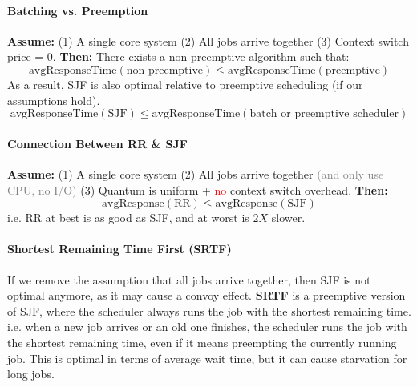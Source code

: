 \documentclass[openany,12pt]{book}
\newcommand{\red}[1]{\textcolor{Red}{#1}}
\newcommand{\gray}[1]{\textcolor{gray}{#1}}
\begin{document}
\begin{samepage}
    \paragraph{Batching vs. Preemption} \textbf{Assume:} (1) A single core system (2) All jobs arrive together (3) Context switch price = 0. \textbf{Then:} There \ul{exists} a non-preemptive algorithm such that:
    \begin{equation*}
        \text{avgResponseTime}(\text{non-preemptive}) \leq \text{avgResponseTime}(\text{preemptive})
    \end{equation*}
    As a result, SJF is also optimal relative to preemptive scheduling (if our assumptions hold).
    \begin{equation*}
        \text{avgResponseTime}(\text{SJF}) \leq \text{avgResponseTime}(\text{batch or preemptive scheduler})
    \end{equation*}
\end{samepage}


\paragraph{Connection Between RR \& SJF} \textbf{Assume:} (1) A single core system (2) All jobs arrive together \gray{(and only use CPU, no I/O)} (3) Quantum is uniform + \red{no} context switch overhead. \textbf{Then:}
\begin{equation*}
    \text{avgResponse}(\text{RR}) \leq \text{avgResponse}(\text{SJF})
\end{equation*}
i.e. RR at best is as good as SJF, and at worst is \(2X\) slower.


\paragraph{Shortest Remaining Time First (SRTF)} If we remove the assumption that all jobs arrive together, then SJF is not optimal anymore, as it may cause a convoy effect. \textbf{SRTF} is a preemptive version of SJF, where the scheduler always runs the job with the shortest remaining time. i.e. when a new job arrives or an old one finishes, the scheduler runs the job with the shortest remaining time, even if it means preempting the currently running job. This is optimal in terms of average wait time, but it can cause starvation for long jobs.
\end{document}
